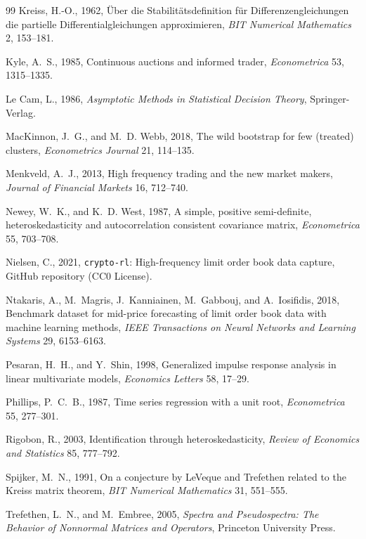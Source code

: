 \documentclass[12pt]{article}
\theoremstyle{definition}
\theoremstyle{remark}
\begin{document}
\begin{thebibliography}{99}
Kreiss, H.-O., 1962, {\"U}ber die Stabilit{\"a}tsdefinition f{\"u}r Differenzengleichungen die partielle Differentialgleichungen approximieren, \emph{BIT Numerical Mathematics} 2, 153--181.

Kyle, A.~S., 1985, Continuous auctions and informed trader, \emph{Econometrica} 53, 1315--1335.

Le Cam, L., 1986, \emph{Asymptotic Methods in Statistical Decision Theory}, Springer-Verlag.

MacKinnon, J.~G., and M.~D. Webb, 2018, The wild bootstrap for few (treated) clusters, \emph{Econometrics Journal} 21, 114--135.

Menkveld, A.~J., 2013, High frequency trading and the new market makers, \emph{Journal of Financial Markets} 16, 712--740.

Newey, W.~K., and K.~D. West, 1987, A simple, positive semi-definite, heteroskedasticity and autocorrelation consistent covariance matrix, \emph{Econometrica} 55, 703--708.

Nielsen, C., 2021, \texttt{crypto-rl}: High-frequency limit order book data capture, GitHub repository (CC0 License).

Ntakaris, A., M.~Magris, J.~Kanniainen, M.~Gabbouj, and A.~Iosifidis, 2018, Benchmark dataset for mid-price forecasting of limit order book data with machine learning methods, \emph{IEEE Transactions on Neural Networks and Learning Systems} 29, 6153--6163.

Pesaran, H.~H., and Y.~Shin, 1998, Generalized impulse response analysis in linear multivariate models, \emph{Economics Letters} 58, 17--29.

Phillips, P.~C.~B., 1987, Time series regression with a unit root, \emph{Econometrica} 55, 277--301.

Rigobon, R., 2003, Identification through heteroskedasticity, \emph{Review of Economics and Statistics} 85, 777--792.

Spijker, M.~N., 1991, On a conjecture by LeVeque and Trefethen related to the Kreiss matrix theorem, \emph{BIT Numerical Mathematics} 31, 551--555.

Trefethen, L.~N., and M.~Embree, 2005, \emph{Spectra and Pseudospectra: The Behavior of Nonnormal Matrices and Operators}, Princeton University Press.

\end{thebibliography}
\end{document}
